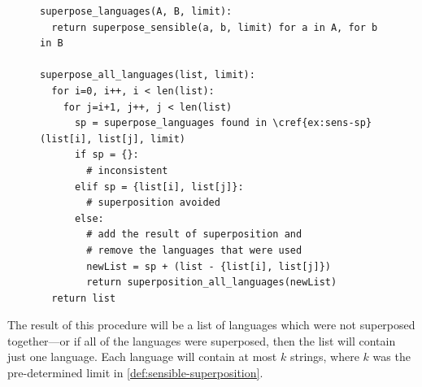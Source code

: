 \documentclass[a4paper,12pt,leqno]{article}
\begin{document}
\begin{center}
\begin{figure}[h!]
\begin{verbatim}	
superpose_languages(A, B, limit):
  return superpose_sensible(a, b, limit) for a in A, for b in B

superpose_all_languages(list, limit):
  for i=0, i++, i < len(list):
    for j=i+1, j++, j < len(list)
      sp = superpose_languages found in \cref{ex:sens-sp}(list[i], list[j], limit)
      if sp = {}:
        # inconsistent
      elif sp = {list[i], list[j]}:
        # superposition avoided
      else:
        # add the result of superposition and
        # remove the languages that were used
        newList = sp + (list - {list[i], list[j]})
        return superposition_all_languages(newList)
  return list
\end{verbatim}
\end{figure}
\label{other:pseudo-code-spsens}
\end{center}
The result of this procedure will be a list of languages which were not superposed together---or if all of the languages were superposed, then the list will contain just one language. Each language will contain at most $k$ strings, where $k$ was the pre-determined limit in \cref{def:sensible-superposition}.
\end{document}
